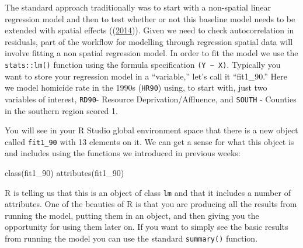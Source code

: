 \documentclass[
  krantz2]{krantz}
\makeatletter
\newenvironment{Shaded}{\begin{snugshade}}{\end{snugshade}}
\newcommand{\AttributeTok}[1]{\textcolor[rgb]{0.61,0.61,0.61}{#1}}
\newcommand{\CommentTok}[1]{\textcolor[rgb]{0.37,0.37,0.37}{\textit{#1}}}
\newcommand{\FunctionTok}[1]{\textcolor[rgb]{0,0,0}{#1}}
\newcommand{\NormalTok}[1]{#1}
\newcommand{\OtherTok}[1]{\textcolor[rgb]{0.37,0.37,0.37}{#1}}
\newcommand{\SpecialCharTok}[1]{\textcolor[rgb]{0,0,0}{#1}}
\newenvironment{kframe}{%
\medskip{}
\setlength{\fboxsep}{.8em}
 \def\at@end@of@kframe{}%
 \ifinner\ifhmode%
  \def\at@end@of@kframe{\end{minipage}}%
  \begin{minipage}{\columnwidth}%
 \fi\fi%
 \def\FrameCommand##1{\hskip\@totalleftmargin \hskip-\fboxsep
 \colorbox{shadecolor}{##1}\hskip-\fboxsep
     \hskip-\linewidth \hskip-\@totalleftmargin \hskip\columnwidth}%
 \MakeFramed {\advance\hsize-\width
   \@totalleftmargin\z@ \linewidth\hsize
   \@setminipage}}%
 {\par\unskip\endMakeFramed%
 \at@end@of@kframe}
\renewenvironment{Shaded}{\begin{kframe}}{\end{kframe}}
\makeatother
\begin{document}
The standard approach traditionally was to start with a non-spatial linear regression model and then to test whether or not this baseline model needs to be extended with spatial effects ((\protect\hyperlink{ref-Elhorst_2014}{2014})). Given we need to check autocorrelation in residuals, part of the workflow for modelling through regression spatial data will involve fitting a non spatial regression model. In order to fit the model we use the \texttt{stats::lm()} function using the formula specification \texttt{(Y\ \textasciitilde{}\ X)}. Typically you want to store your regression model in a ``variable,'' let's call it ``fit1\_90.'' Here we model homicide rate in the 1990s (\texttt{HR90}) using, to start with, just two variables of interest, \texttt{RD90}- Resource Deprivation/Affluence, and \texttt{SOUTH} - Counties in the southern region scored 1.

\begin{Shaded}
\end{Shaded}

You will see in your R Studio global environment space that there is a new object called \texttt{fit1\_90} with 13 elements on it. We can get a sense for what this object is and includes using the functions we introduced in previous weeks:

\begin{Shaded}
\begin{Highlighting}[]
\FunctionTok{class}\NormalTok{(fit1\_90)}
\FunctionTok{attributes}\NormalTok{(fit1\_90)}
\end{Highlighting}
\end{Shaded}

R is telling us that this is an object of class \texttt{lm} and that it includes a number of attributes. One of the beauties of R is that you are producing all the results from running the model, putting them in an object, and then giving you the opportunity for using them later on. If you want to simply see the basic results from running the model you can use the standard \texttt{summary()} function.
\end{document}
